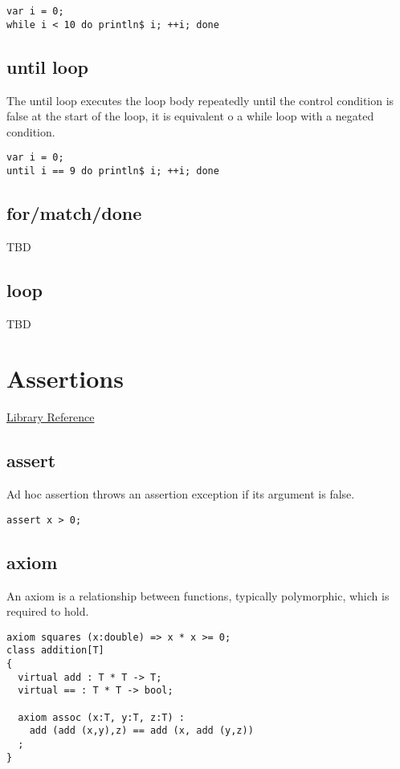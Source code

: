 \documentclass[oneside]{book}
\begin{document}
{\begin{verbatim}
var i = 0;
while i < 10 do println$ i; ++i; done
\end{verbatim}


\subsection{until loop}
The until loop executes the loop body repeatedly
until the control condition is false at the start of the loop,
it is equivalent o a while loop with a negated condition.

\begin{verbatim}
var i = 0;
until i == 9 do println$ i; ++i; done
\end{verbatim}


\subsection{for/match/done}
TBD
\subsection{loop}
TBD
\section{Assertions}
\href{http://felix-lang.org/share/lib/grammar/assertions.fsyn}{Library Reference}
\subsection{assert}
Ad hoc assertion throws an assertion exception if its argument
is false. 

\begin{verbatim}
assert x > 0;
\end{verbatim}


\subsection{axiom}
An axiom is a relationship between functions, typically
polymorphic, which is required to hold.

\begin{verbatim}
axiom squares (x:double) => x * x >= 0;
class addition[T]
{
  virtual add : T * T -> T;
  virtual == : T * T -> bool;

  axiom assoc (x:T, y:T, z:T) : 
    add (add (x,y),z) == add (x, add (y,z))
  ;
}
\end{verbatim}

}
\end{document}
